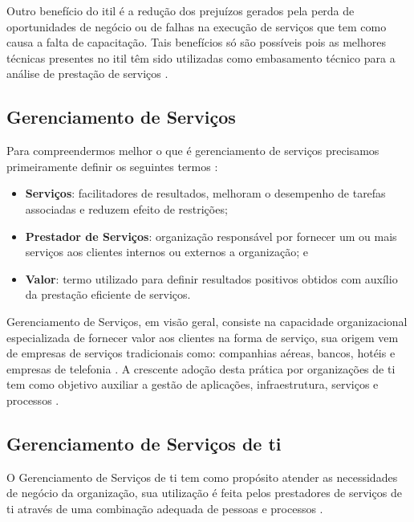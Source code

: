 Outro benefício do \acrshort{itil} é a redução dos prejuízos gerados pela perda de oportunidades de negócio ou de falhas na execução de serviços que tem como causa a falta de capacitação. Tais benefícios só são possíveis pois as melhores técnicas presentes no \acrshort{itil} têm sido utilizadas como embasamento técnico para a análise de prestação de serviços \cite{abreu2012implantando}.

\subsection{Gerenciamento de Serviços}

\noindent Para compreendermos melhor o que é gerenciamento de serviços precisamos primeiramente definir os seguintes termos \cite{servicestrategy, introductoryoverviewofitil}:

\begin{itemize}
    \item \textbf{Serviços}: facilitadores de resultados, melhoram o desempenho de tarefas associadas e reduzem efeito de restrições;
    \item \textbf{Prestador de Serviços}: organização responsável por fornecer um ou mais serviços aos clientes internos ou externos a organização; e
    \item \textbf{Valor}: termo utilizado para definir resultados positivos obtidos com auxílio da prestação eficiente de serviços.
\end{itemize}

Gerenciamento de Serviços, em visão geral, consiste na capacidade organizacional especializada de fornecer valor aos clientes na forma de serviço, sua origem vem de empresas de serviços tradicionais como: companhias aéreas, bancos, hotéis e empresas de telefonia \cite{servicestrategy, itilservicemanagement}. A crescente adoção desta prática  por organizações de \acrshort{ti} tem como objetivo auxiliar a gestão de aplicações, infraestrutura, serviços e processos \cite{servicestrategy}.

\subsection{Gerenciamento de Serviços de \acrshort{ti}}

\noindent O Gerenciamento de Serviços de \acrshort{ti} tem como propósito atender as necessidades de negócio da organização, sua utilização é feita pelos prestadores de serviços de \acrshort{ti} através de uma combinação adequada de pessoas e processos \cite{servicestrategy}.

